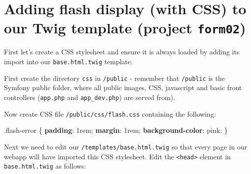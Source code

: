 \documentclass[a4paperpaper,openright]{book}
\newenvironment{Shaded}{}{}
\newcommand{\ConstantTok}[1]{\textcolor[rgb]{0.53,0.00,0.00}{#1}}
\newcommand{\DataTypeTok}[1]{\textcolor[rgb]{0.56,0.13,0.00}{#1}}
\newcommand{\DecValTok}[1]{\textcolor[rgb]{0.25,0.63,0.44}{#1}}
\newcommand{\FunctionTok}[1]{\textcolor[rgb]{0.02,0.16,0.49}{#1}}
\newcommand{\ImportTok}[1]{#1}
\newcommand{\KeywordTok}[1]{\textcolor[rgb]{0.00,0.44,0.13}{\textbf{#1}}}
\newcommand{\NormalTok}[1]{#1}
\newcommand{\OperatorTok}[1]{\textcolor[rgb]{0.40,0.40,0.40}{#1}}
\newcommand{\OtherTok}[1]{\textcolor[rgb]{0.00,0.44,0.13}{#1}}
\newcommand{\StringTok}[1]{\textcolor[rgb]{0.25,0.44,0.63}{#1}}
\begin{document}
\hypertarget{adding-flash-display-with-css-to-our-twig-template-project-form02}{%
\section{\texorpdfstring{Adding flash display (with CSS) to our Twig
template (project
\texttt{form02})}{Adding flash display (with CSS) to our Twig template (project form02)}}\label{adding-flash-display-with-css-to-our-twig-template-project-form02}}

First let's create a CSS stylesheet and ensure it is always loaded by
adding its import into our \texttt{base.html.twig} template.

First create the directory \texttt{css} in \texttt{/public} - remember
that \texttt{/public} is the Symfony public folder, where all public
images, CSS, javascript and basic front controllers (\texttt{app.php}
and \texttt{app\_dev.php}) are served from).

Now create CSS file \texttt{/public/css/flash.css} containing the
following:

\begin{Shaded}
\begin{Highlighting}[]
    \FunctionTok{.flash-error}\NormalTok{ \{}
        \KeywordTok{padding}\NormalTok{: }\DecValTok{1}\DataTypeTok{rem}\OperatorTok{;}
        \KeywordTok{margin}\NormalTok{: }\DecValTok{1}\DataTypeTok{rem}\OperatorTok{;}
        \KeywordTok{background-color}\NormalTok{: }\ConstantTok{pink}\OperatorTok{;}
\NormalTok{    \}}
\end{Highlighting}
\end{Shaded}

Next we need to edit our \texttt{/templates/base.html.twig} so that
every page in our webapp will have imported this CSS stylesheet. Edit
the \texttt{\textless{}head\textgreater{}} element in
\texttt{base.html.twig} as follows:

\begin{Shaded}
\end{Shaded}
\end{document}
